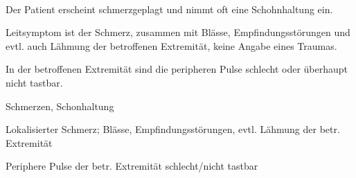 \TextSlide
{\TxABCDE}
{~
\begin{ABCDEText}
  \item[\ABCDE{2}] Der Patient erscheint
  schmerzgeplagt und nimmt oft eine Schohnhaltung ein.
  \item[\ABCDE{4}] Leitsymptom ist der
  Schmerz, zusammen mit Blässe, Empfindungsstörungen und evtl.
  auch Lähmung der betroffenen Extremität, keine Angabe
  eines Traumas.
  \item[\ABCDE{C}] In der betroffenen Extremität sind die
  peripheren Pulse schlecht oder überhaupt nicht tastbar.
\end{ABCDEText}
}
{
\begin{ABCDESlide}
  \item[\ABCDE{2}] Schmerzen, Schonhaltung
  \item[\ABCDE{4}] Lokalisierter Schmerz; Blässe, Empfindungsstörungen, evtl. Lähmung der betr. Extremität
  \item[\ABCDE{C}] Periphere Pulse der betr. Extremität schlecht/nicht tastbar
\end{ABCDESlide}
}
{}
{}
{}

\begin{Synopsis}
\end{Synopsis}

